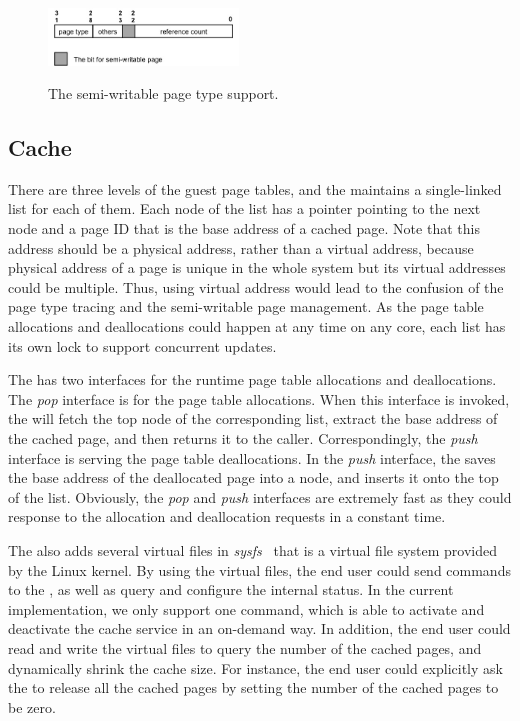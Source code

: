 \begin{figure}[ht]
\centering
\includegraphics[width=0.45\textwidth]{image/implementation/field-of-semi-type.jpg} \\
\caption{The semi-writable page type support.}
\label{fig:field-of-semi-type}
\end{figure}

\subsection{\name Cache}
There are three levels of the guest page tables, and the \cache maintains a single-linked list for each of them.
Each node of the list has a pointer pointing to the next node and a page ID that is the base address of a cached page.
Note that this address should be a physical address, rather than a virtual address, because physical address of a page is unique in the whole system but its virtual addresses could be multiple.
Thus, using virtual address would lead to the confusion of the page type tracing and the semi-writable page management.
As the page table allocations and deallocations could happen at any time on any core, each list has its own lock to support concurrent updates.

The \cache has two interfaces for the runtime page table allocations and deallocations.
The \emph{pop} interface is for the page table allocations.
When this interface is invoked, the \cache will fetch the top node of the corresponding list, extract the base address of the cached page, and then returns it to the caller.
Correspondingly, the \emph{push} interface is serving the page table deallocations.
In the \emph{push} interface, the \cache saves the base address of the deallocated page into a node, and inserts it onto the top of the list.
Obviously, the \emph{pop} and \emph{push} interfaces are extremely fast as they could response to the allocation and deallocation requests in a constant time.

The \cache also adds several virtual files in \emph{sysfs}~\cite{love2004linux,mochel2005sysfs} that is a virtual file system provided by the Linux kernel.
By using the virtual files, the end user could send commands to the \cache,  as well as query and configure the internal status.
In the current implementation, we only support one command, which is able to activate and deactivate the cache service in an on-demand way.
In addition, the end user could read and write the virtual files to query the number of the cached pages, and dynamically shrink the cache size.
For instance, the end user could explicitly ask the \cache to release all the cached pages by setting the number of the cached pages to be zero.


